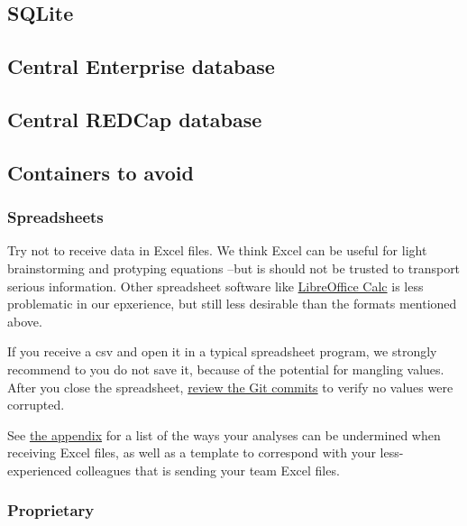 \documentclass[
]{book}
\begin{document}
\hypertarget{data-containers-sqlite}{%
\subsection{SQLite}\label{data-containers-sqlite}}

\hypertarget{data-containers-database}{%
\subsection{Central Enterprise database}\label{data-containers-database}}

\hypertarget{data-containers-redcap}{%
\subsection{Central REDCap database}\label{data-containers-redcap}}

\hypertarget{data-containers-avoid}{%
\subsection{Containers to avoid}\label{data-containers-avoid}}

\hypertarget{data-containers-avoid-spreadsheets}{%
\subsubsection{Spreadsheets}\label{data-containers-avoid-spreadsheets}}

Try not to receive data in Excel files. We think Excel can be useful for light brainstorming and protyping equations --but is should not be trusted to transport serious information. Other spreadsheet software like \href{https://en.wikipedia.org/wiki/LibreOffice_Calc}{LibreOffice Calc} is less problematic in our epxerience, but still less desirable than the formats mentioned above.

If you receive a csv and open it in a typical spreadsheet program, we strongly recommend to you do not save it, because of the potential for mangling values. After you close the spreadsheet, \protect\hyperlink{git-stability}{review the Git commits} to verify no values were corrupted.

See \protect\hyperlink{snippets-correspondence-excel}{the appendix} for a list of the ways your analyses can be undermined when receiving Excel files, as well as a template to correspond with your less-experienced colleagues that is sending your team Excel files.

\hypertarget{data-containers-avoid-proprietary}{%
\subsubsection{Proprietary}\label{data-containers-avoid-proprietary}}
\end{document}
